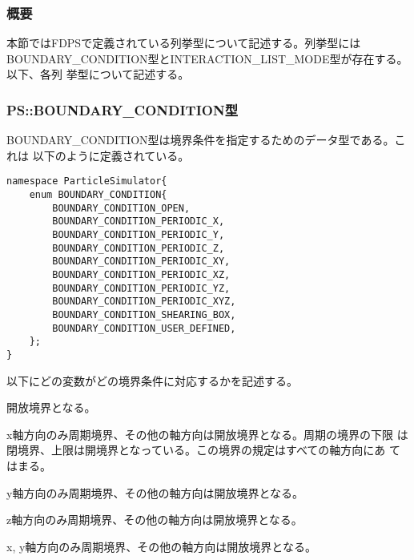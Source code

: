 \subsubsection{概要}

本節ではFDPSで定義されている列挙型について記述する。列挙型には
BOUNDARY\_CONDITION型とINTERACTION\_LIST\_MODE型が存在する。以下、各列
挙型について記述する。

\subsubsection{PS::BOUNDARY\_CONDITION型}
\label{sec:datatype_enum_boundarycondition}


BOUNDARY\_CONDITION型は境界条件を指定するためのデータ型である。これは
以下のように定義されている。
\begin{lstlisting}[caption=boundarycondition]
namespace ParticleSimulator{
    enum BOUNDARY_CONDITION{
        BOUNDARY_CONDITION_OPEN,
        BOUNDARY_CONDITION_PERIODIC_X,
        BOUNDARY_CONDITION_PERIODIC_Y,
        BOUNDARY_CONDITION_PERIODIC_Z,
        BOUNDARY_CONDITION_PERIODIC_XY,
        BOUNDARY_CONDITION_PERIODIC_XZ,
        BOUNDARY_CONDITION_PERIODIC_YZ,
        BOUNDARY_CONDITION_PERIODIC_XYZ,
        BOUNDARY_CONDITION_SHEARING_BOX,
        BOUNDARY_CONDITION_USER_DEFINED,
    };
}
\end{lstlisting}

以下にどの変数がどの境界条件に対応するかを記述する。


開放境界となる。


x軸方向のみ周期境界、その他の軸方向は開放境界となる。周期の境界の下限
は閉境界、上限は開境界となっている。この境界の規定はすべての軸方向にあ
てはまる。


y軸方向のみ周期境界、その他の軸方向は開放境界となる。


z軸方向のみ周期境界、その他の軸方向は開放境界となる。


x, y軸方向のみ周期境界、その他の軸方向は開放境界となる。

